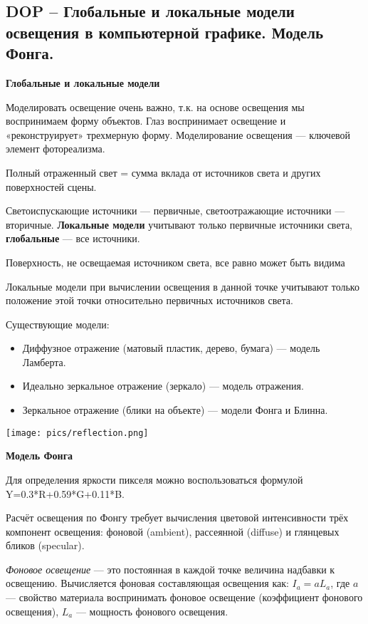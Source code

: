 \subsection{DOP -- Глобальные и локальные модели освещения в компьютерной графике. Модель Фонга.}

\textbf{Глобальные и локальные модели}

Моделировать освещение очень важно, т.к. на основе освещения мы воспринимаем форму объектов. Глаз воспринимает освещение и «реконструирует» трехмерную форму. Моделирование освещения --- ключевой элемент фотореализма.

Полный отраженный свет = сумма вклада от источников света и других поверхностей сцены.

Светоиспускающие источники --- первичные, светоотражающие источники --- вторичные. 
\textbf{Локальные модели} учитывают только первичные источники
света, \textbf{глобальные} --- все источники. 

Поверхность, не освещаемая источником света, все равно может быть видима

Локальные модели при вычислении освещения в данной точке учитывают только положение этой точки относительно первичных источников света.

Существующие модели:
\begin{itemize}
    \item Диффузное отражение (матовый пластик, дерево, бумага) --- модель Ламберта. 
    \item Идеально зеркальное отражение (зеркало) --- модель отражения.
    \item Зеркальное отражение (блики на объекте) --- модели Фонга и Блинна.
\end{itemize}

\texttt{[image: pics/reflection.png]}

\textbf{Модель Фонга}

Для определения яркости пикселя можно воспользоваться формулой Y=0.3*R+0.59*G+0.11*B.

Расчёт освещения по Фонгу требует вычисления цветовой интенсивности трёх компонент освещения: фоновой (ambient), рассеянной (diffuse) и глянцевых бликов (specular).

\textit{Фоновое освещение} --- это постоянная в каждой точке величина надбавки к освещению. 
Вычисляется фоновая составляющая освещения как: $I_a = a L_a$, где $a$ --- свойство материала воспринимать фоновое освещение (коэффициент фонового освещения), $L_a$ --- мощность фонового освещения.

